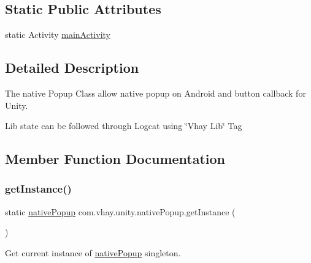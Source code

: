 \subsection*{Static Public Attributes}
\begin{DoxyCompactItemize}
\item 
static Activity \mbox{\hyperlink{classcom_1_1vhay_1_1unity_1_1native_popup_a719bd6ea2a582ea5a85cb896abcef72e}{main\+Activity}}
\end{DoxyCompactItemize}


\subsection{Detailed Description}
The native Popup Class allow native popup on Android and button callback for Unity. 

Lib state can be followed through Logcat using \char`\"{}\+Vhay Lib\char`\"{} Tag 

\subsection{Member Function Documentation}
\mbox{\label{classcom_1_1vhay_1_1unity_1_1native_popup_a62064472406ea7f13c73130ac7b7cb79}} 
\subsubsection{\texorpdfstring{get\+Instance()}{getInstance()}}
{\footnotesize\ttfamily static \mbox{\hyperlink{classcom_1_1vhay_1_1unity_1_1native_popup}{native\+Popup}} com.\+vhay.\+unity.\+native\+Popup.\+get\+Instance (\begin{DoxyParamCaption}{ }\end{DoxyParamCaption})\hspace{0.3cm}{\ttfamily [static]}}



Get current instance of \mbox{\hyperlink{classcom_1_1vhay_1_1unity_1_1native_popup}{native\+Popup}} singleton. 

\mbox{\label{classcom_1_1vhay_1_1unity_1_1native_popup_a87b00a3bfaceb0d04684d0b882bec83b}} 
